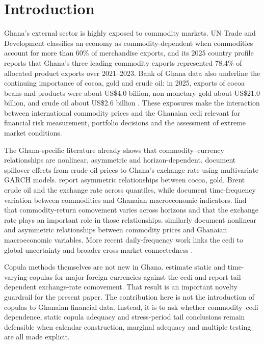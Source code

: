 \section{Introduction}
\label{sec:introduction}

Ghana's external sector is highly exposed to commodity markets. UN Trade and Development classifies an economy as commodity-dependent when commodities account for more than 60\% of merchandise exports, and its 2025 country profile reports that Ghana's three leading commodity exports represented 78.4\% of allocated product exports over 2021--2023. Bank of Ghana data also underline the continuing importance of cocoa, gold and crude oil: in 2025, exports of cocoa beans and products were about US\$4.0 billion, non-monetary gold about US\$21.0 billion, and crude oil about US\$2.6 billion \citep{unctad2025,bog2025}. These exposures make the interaction between international commodity prices and the Ghanaian cedi relevant for financial risk measurement, portfolio decisions and the assessment of extreme market conditions.

The Ghana-specific literature already shows that commodity--currency relationships are nonlinear, asymmetric and horizon-dependent. \citet{zankawah2020} document spillover effects from crude oil prices to Ghana's exchange rate using multivariate GARCH models. \citet{archer2022} report asymmetric relationships between cocoa, gold, Brent crude oil and the exchange rate across quantiles, while \citet{boateng2022} document time-frequency variation between commodities and Ghanaian macroeconomic indicators. \citet{barson2023} find that commodity-return comovement varies across horizons and that the exchange rate plays an important role in those relationships. \citet{yeboah2025} similarly document nonlinear and asymmetric relationships between commodity prices and Ghanaian macroeconomic variables. More recent daily-frequency work links the cedi to global uncertainty and broader cross-market connectedness \citep{atipaga2025,woode2025}.

Copula methods themselves are not new in Ghana. \citet{mensah2020} estimate static and time-varying copulas for major foreign currencies against the cedi and report tail-dependent exchange-rate comovement. That result is an important novelty guardrail for the present paper. The contribution here is not the introduction of copulas to Ghanaian financial data. Instead, it is to ask whether commodity--cedi dependence, static copula adequacy and stress-period tail conclusions remain defensible when calendar construction, marginal adequacy and multiple testing are all made explicit.

